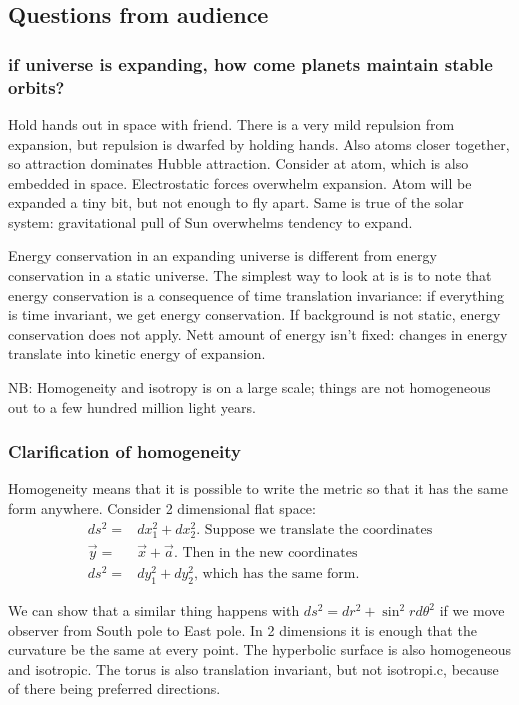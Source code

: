 \documentclass[]{article}
\begin{document}
\subsection{Questions from audience}
\subsubsection{if universe is expanding, how come planets maintain stable orbits?}

Hold hands out in space with friend. There is a very mild repulsion from expansion, but repulsion is dwarfed by holding hands. Also atoms closer together, so attraction dominates Hubble attraction. Consider at atom, which is also embedded in space. Electrostatic forces overwhelm expansion. Atom will be expanded a tiny bit, but not enough to fly apart. Same is true of the solar system: gravitational pull of Sun overwhelms tendency to expand.

Energy conservation in an expanding universe is different from energy conservation in a static universe. The simplest way to look at is is to note that energy conservation is a consequence of time translation invariance: if everything is time invariant, we get energy conservation. If background is not static, energy conservation does not apply. Nett amount of energy isn't fixed: changes in energy translate into kinetic energy of expansion.

NB: Homogeneity and isotropy is on a large scale; things are not homogeneous out to a few hundred million light years.

\subsubsection{Clarification of homogeneity}

Homogeneity means that it is possible to write the metric so that it has the same form anywhere. Consider  2 dimensional flat space:
\begin{align*}
	ds^2 =& dx_1^2 + dx_2^2 \text{. Suppose we translate the coordinates}\\
	\vec{y} =& \vec{x} + \vec{a} \text{. Then in the new coordinates}\\
	ds^2 =&dy_1^2 + dy_2^2 \text{, which has the same form.}
\end{align*}

We can show that a similar thing happens with $ds^2=dr^2 + \sin^2 r d\theta^2$ if we move observer from South pole to East pole. In 2 dimensions it is enough that the curvature be the same at every point. The hyperbolic surface is also homogeneous and isotropic. The torus is also translation invariant, but not isotropi.c, because of there being preferred directions.
\end{document}
